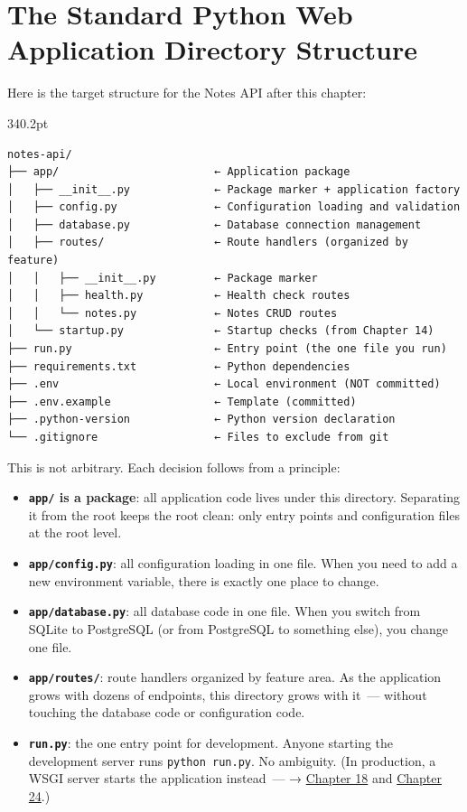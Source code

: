\setcounter{section}{1}
\section{The Standard Python Web Application Directory Structure}\label{15-structuring-the-application:152-the-standard-python-web-application-directory-structure}

Here is the target structure for the Notes API after this chapter:

\begin{diagrambox}[short]{340.2pt}
\begin{Verbatim}[fontsize=\fontsize{9.0}{8.55}\selectfont]
notes-api/
├── app/                        ← Application package
│   ├── __init__.py             ← Package marker + application factory
│   ├── config.py               ← Configuration loading and validation
│   ├── database.py             ← Database connection management
│   ├── routes/                 ← Route handlers (organized by feature)
│   │   ├── __init__.py         ← Package marker
│   │   ├── health.py           ← Health check routes
│   │   └── notes.py            ← Notes CRUD routes
│   └── startup.py              ← Startup checks (from Chapter 14)
├── run.py                      ← Entry point (the one file you run)
├── requirements.txt            ← Python dependencies
├── .env                        ← Local environment (NOT committed)
├── .env.example                ← Template (committed)
├── .python-version             ← Python version declaration
└── .gitignore                  ← Files to exclude from git
\end{Verbatim}
\end{diagrambox}

\noindent{}This is not arbitrary. Each decision follows from a principle:

\begin{itemize}
\tightlist
\item
  \textbf{\texttt{app/} is a package}: all application code lives under this directory. Separating it from the root keeps the root clean: only entry points and configuration files at the root level.
\item
  \textbf{\texttt{app/config.py}}: all configuration loading in one file. When you need to add a new environment variable, there is exactly one place to change.
\item
  \textbf{\texttt{app/database.py}}: all database code in one file. When you switch from SQLite to PostgreSQL (or from PostgreSQL to something else), you change one file.
\item
  \textbf{\texttt{app/routes/}}: route handlers organized by feature area. As the application grows with dozens of endpoints, this directory grows with it~--- without touching the database code or configuration code.
\item
  \textbf{\texttt{run.py}}: the one entry point for development. Anyone starting the development server runs \texttt{python\ run.py}. No ambiguity. (In production, a WSGI server starts the application instead~--- → \hyperref[ch:18-containerization]{Chapter 18} and \hyperref[ch:24-process-startup]{Chapter 24}.)
\end{itemize}

